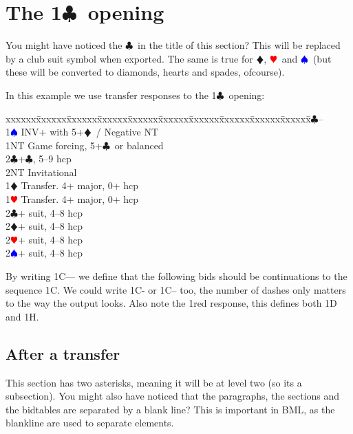 \documentclass[a4paper]{article}
\newcommand{\BC}{\textcolor{OliveGreen}{$\clubsuit$}}
\newcommand{\BD}{\textcolor{RedOrange}{$\vardiamondsuit$}}
\newcommand{\BH}{\textcolor{Red}{$\varheartsuit${}}}
\newcommand{\BS}{\textcolor{Blue}{$\spadesuit${}}}
\newcommand{\pdfc}{\texorpdfstring{\BC{}}{C}}
\newenvironment{bidtable}
{\begin{tabbing}

xxxxxx\=xxxxxx\=xxxxxx\=xxxxxx\=xxxxxx\=xxxxxx\=xxxxxx\=xxxxxx\=xxxxxx\=xxxxxx\=\kill}
{\end{tabbing} }%
\begin{document}
\section{The 1\pdfc\ opening}

You might have noticed the \BC\ in the title of this section? This
will be replaced by a club suit symbol when exported. The same is
true for \BD , \BH\ and \BS\ (but these will be converted to diamonds,
hearts and spades, ofcourse).

In this example we use transfer responses to the 1\BC\ opening:

\begin{bidtable}
1\BC--\+\\
1\BS \> INV+ with 5+\BD\ / Negative NT\\
1NT \> Game forcing, 5+\BC\ or balanced\\
2\BC {}+\BC , 5--9 hcp\\
2NT \> Invitational\\
1\BD \> Transfer. 4+ major, 0+ hcp\\
1\BH \> Transfer. 4+ major, 0+ hcp\\
2\BC {}+ suit, 4--8 hcp\\
2\BD {}+ suit, 4--8 hcp\\
2\BH {}+ suit, 4--8 hcp\\
2\BS {}+ suit, 4--8 hcp\-
\end{bidtable}

By writing 1C--- we define that the following bids should be
continuations to the sequence 1C. We could write 1C- or 1C-- too,
the number of dashes only matters to the way the output looks. Also
note the 1red response, this defines both 1D and 1H.

\subsection{After a transfer}

This section has two asterisks, meaning it will be at level two
(so its a subsection). You might also have noticed that the
paragraphs, the sections and the bidtables are separated by a
blank line? This is important in BML, as the blankline are used to
separate elements.
\end{document}
